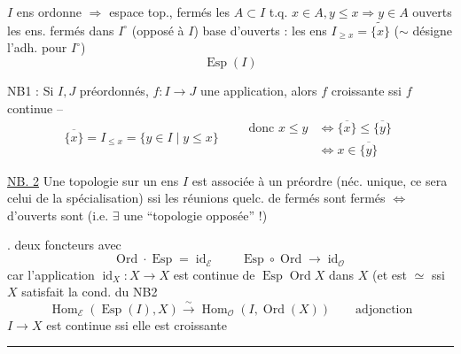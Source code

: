 $I$ ens ordonne $\Longrightarrow$ espace top., fermés les $A\subset I$ t.q. $x\in A,y\leq x\Rightarrow y\in A$
ouverts les ens. fermés dans $I^\circ$ (opposé à $I$)
base d'ouverts : les ens $I_{\geq x}=\widetilde{\{x\}}$ ($\sim$ désigne l'adh. pour $I^\circ$)
\[
\operatorname{Esp}(I)
\]

NB1 : Si $I,J$ préordonnés, $f:I\longrightarrow J$
une application, alors $f$ croissante ssi
$f$ continue --
\[
\overline{\{x\}}=I_{\leq x}=\{y\in I\mid y\leq x\}\qquad
\begin{aligned}
\text{donc }x\leq y&\Longleftrightarrow\overline{\{x\}}\leq\overline{\{y\}}\\
&\Longleftrightarrow x\in\overline{\{y\}}
\end{aligned}
\]

\uline{NB. 2} Une topologie sur un ens $I$ est associée à
un préordre (néc. unique,  ce sera celui de
la spécialisation) ssi les réunions quelc. de
fermés sont fermés $\Longleftrightarrow$  d'ouverts
sont  (i.e. $\exists$ une ``topologie opposée'' !)

. deux foncteurs
avec
\[
\operatorname{Ord}\cdot\operatorname{Esp}=\operatorname{id}_{\mathcal E}
\qquad
\operatorname{Esp}\circ\operatorname{Ord}\longrightarrow\operatorname{id}_{\mathcal O}
\]
car l'application $\operatorname{id}_X:X\longrightarrow X$
est continue de $\operatorname{Esp}\operatorname{Ord}X$
dans $X$ (et est $\simeq$ ssi $X$
satisfait la cond. du NB2
\[
\operatorname{Hom}_{\mathcal E}(\operatorname{Esp}(I),X)\xrightarrow{\sim}
\operatorname{Hom}_{\mathcal O}(I,\operatorname{Ord}(X))\qquad\text{adjonction}
\]
$I\longrightarrow X$ est continue ssi elle est croissante
\par\noindent\rule{2cm}{0.4pt}


